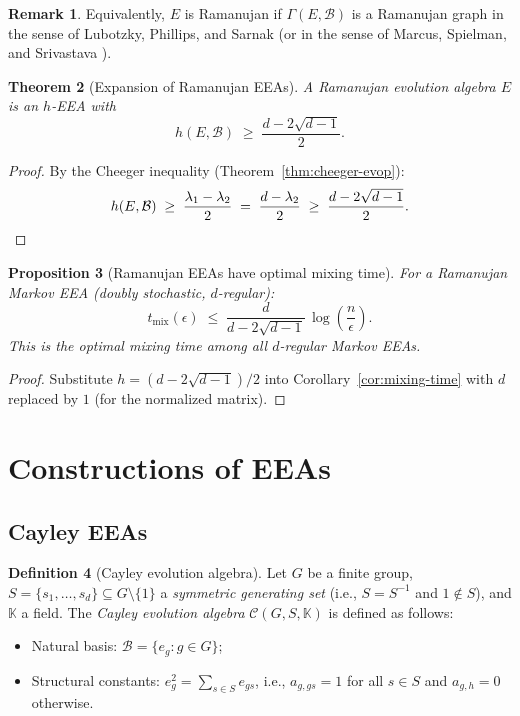 \documentclass[12pt,a4paper]{amsart}
\newtheorem{theorem}{Theorem}[section]
\newtheorem{proposition}[theorem]{Proposition}
\theoremstyle{definition}
\newtheorem{definition}[theorem]{Definition}
\newtheorem{remark}[theorem]{Remark}
\newcommand{\K}{\mathbb{K}}
\newcommand{\hh}{h}          %
\newcommand{\EA}{E}          %
\newcommand{\natbasis}{\mathcal{B}}  %
\begin{document}
\begin{remark}
Equivalently, $\EA$ is Ramanujan if $\varGamma(\EA,\natbasis)$ is a
Ramanujan graph in the sense of Lubotzky, Phillips, and Sarnak
\cite{LPS1988} (or in the sense of Marcus, Spielman, and Srivastava
\cite{MSS2015}).
\end{remark}

\begin{theorem}[Expansion of Ramanujan EEAs]\label{thm:Ramanujan-expansion}
A Ramanujan evolution algebra $\EA$ is an $h$-EEA with
\[
  \hh(\EA,\natbasis) \;\ge\; \frac{d - 2\sqrt{d-1}}{2}.
\]
\end{theorem}

\begin{proof}
By the Cheeger inequality (Theorem~\ref{thm:cheeger-evop}):
\[
  \hh(\EA,\natbasis) \;\ge\;
  \frac{\lambda_1-\lambda_2}{2}
  \;=\;
  \frac{d-\lambda_2}{2}
  \;\ge\;
  \frac{d-2\sqrt{d-1}}{2}.
  \qedhere
\]
\end{proof}

\begin{proposition}[Ramanujan EEAs have optimal mixing time]\label{prop:Ramanujan-mixing}
For a Ramanujan Markov EEA (doubly stochastic, $d$-regular):
\[
  t_\mathrm{mix}(\epsilon)
  \;\le\;
  \frac{d}{d-2\sqrt{d-1}}\,\log\!\left(\frac{n}{\epsilon}\right).
\]
This is the optimal mixing time among all $d$-regular Markov EEAs.
\end{proposition}

\begin{proof}
Substitute $h=(d-2\sqrt{d-1})/2$ into Corollary~\ref{cor:mixing-time}
with $d$ replaced by $1$ (for the normalized matrix).
\end{proof}

\section{Constructions of EEAs}\label{sec:constructions}

\subsection{Cayley EEAs}\label{sec:cayley}

\begin{definition}[Cayley evolution algebra]\label{def:cayley-EA}
Let $G$ be a finite group, $S=\{s_1,\ldots,s_d\}\subseteq G\setminus
\{1\}$ a \emph{symmetric generating set} (i.e., $S=S^{-1}$ and
$1\notin S$), and $\K$ a field.  The \emph{Cayley evolution algebra}
$\mathcal{C}(G,S,\K)$ is defined as follows:
\begin{itemize}
  \item Natural basis: $\natbasis=\{e_g : g\in G\}$;
  \item Structural constants: $e_g^2=\sum_{s\in S} e_{gs}$,
        i.e., $a_{g,gs}=1$ for all $s\in S$ and $a_{g,h}=0$ otherwise.
\end{itemize}
\end{definition}
\end{document}
